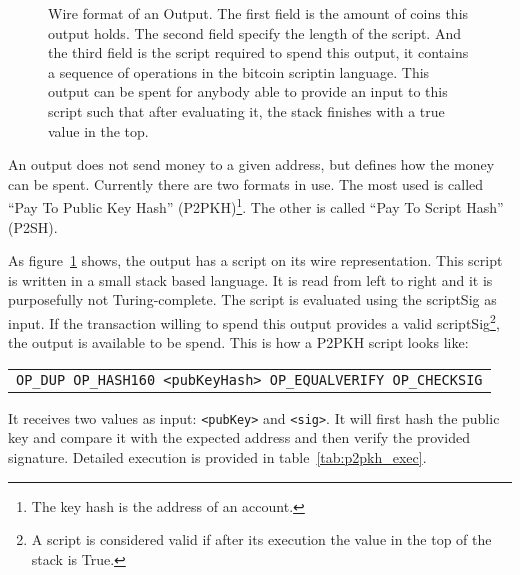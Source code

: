 \begin{figure}[ht]
  \centering
  
  \caption[Wire format of an Output]{Wire format of an Output.
           The first field is the amount of coins this output holds.
           The second field specify the length of the script.
           And the third field is the script required to spend this output,
             it contains a sequence of operations in the bitcoin scriptin
             language.
           This output can be spent for anybody able to provide an input to this
             script such that after evaluating it, the stack finishes with a
             true value in the top.
             }
  \label{fig:output}
\end{figure}

An output does not send money to a given address, but defines how the money can
  be spent. Currently there are two formats in use. The most used is called
  ``Pay To Public Key Hash'' (P2PKH)\footnote{The key hash is the address of an
  account.}. The other is called ``Pay To Script Hash'' (P2SH).

As figure~\ref{fig:output} shows, the output has a script on its wire
  representation.
This script is written in a small stack based language.
It is read from left to right and it is purposefully not Turing-complete.
The script is evaluated using the scriptSig as input. If the transaction willing
  to spend this output provides a valid scriptSig\footnote{A script is
  considered valid if after its execution the value in the top of the stack is
  True.}, the output is available to be spend. This is how a P2PKH script looks
  like:

\begin{center}
  \begin{tabular}{|c|}
    \texttt{OP\_DUP OP\_HASH160 <pubKeyHash> OP\_EQUALVERIFY OP\_CHECKSIG}
  \end{tabular}
\end{center}

It receives two values as input:  \lstinline{<pubKey>} and \lstinline{<sig>}.
It will first hash the public key and compare it with the expected address and
  then verify the provided signature.
Detailed execution is provided in table~\ref{tab:p2pkh_exec}.

